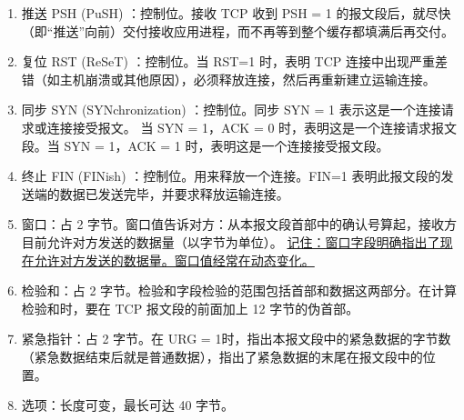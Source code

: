 \documentclass[11pt]{article}
\begin{document}
\begin{enumerate}
\begin{itemize}
\begin{enumerate}
\item 推送 PSH (PuSH) ：控制位。接收 TCP 收到 PSH = 1 的报文段后，就尽快（即“推送”向前）交付接收应用进程，而不再等到整个缓存都填满后再交付。

\item 复位 RST (ReSeT) ：控制位。当 RST=1 时，表明 TCP 连接中出现严重差错（如主机崩溃或其他原因），必须释放连接，然后再重新建立运输连接。

\item 同步 SYN (SYNchronization) ：控制位。同步 SYN = 1 表示这是一个连接请求或连接接受报文。 当 SYN = 1，ACK = 0 时，表明这是一个连接请求报文段。当 SYN = 1，ACK = 1 时，表明这是一个连接接受报文段。

\item 终止 FIN (FINish) ：控制位。用来释放一个连接。FIN=1 表明此报文段的发送端的数据已发送完毕，并要求释放运输连接。

\item 窗口：占 2 字节。窗口值告诉对方：从本报文段首部中的确认号算起，接收方目前允许对方发送的数据量（以字节为单位）。 \uline{记住：窗口字段明确指出了现在允许对方发送的数据量。窗口值经常在动态变化。}

\item 检验和：占 2 字节。检验和字段检验的范围包括首部和数据这两部分。在计算检验和时，要在 TCP 报文段的前面加上 12 字节的伪首部。

\item 紧急指针：占 2 字节。在 URG = 1时，指出本报文段中的紧急数据的字节数（紧急数据结束后就是普通数据），指出了紧急数据的末尾在报文段中的位置。

\item 选项：长度可变，最长可达 40 字节。
\end{enumerate}
\end{itemize}
\end{enumerate}
\end{document}
